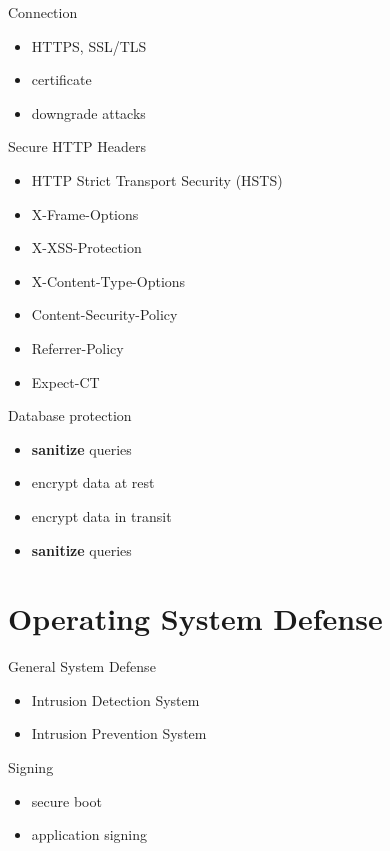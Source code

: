 \documentclass{curs}
\begin{document}
\begin{frame}{Connection}
  \begin{itemize}
    \item HTTPS, SSL/TLS
    \item certificate
    \item downgrade attacks
  \end{itemize}
\end{frame}

\begin{frame}{Secure HTTP Headers}
  \begin{itemize}
    \item HTTP Strict Transport Security (HSTS)
    \item X-Frame-Options
    \item X-XSS-Protection
    \item X-Content-Type-Options
    \item Content-Security-Policy
    \item Referrer-Policy
    \item Expect-CT
  \end{itemize}
\end{frame}

\begin{frame}{Database protection}
  \begin{itemize}
    \item \textbf{sanitize} queries
    \item encrypt data at rest
    \item encrypt data in transit
    \item \textbf{sanitize} queries
  \end{itemize}
\end{frame}


\section{Operating System Defense}

\begin{frame}{General System Defense}
  \begin{itemize}
    \item Intrusion Detection System
    \item Intrusion Prevention System
  \end{itemize}
\end{frame}

\begin{frame}{Signing}
  \begin{itemize}
    \item secure boot
    \item application signing
  \end{itemize}
\end{frame}
\end{document}
